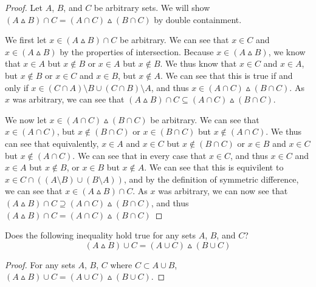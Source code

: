     \begin{proof}
    Let $A$, $B$, and $C$ be arbitrary sets. We will show $(A \vartriangle B) \cap C = (A \cap C) \vartriangle (B \cap C)$ by double containment.
    
    We first let $x \in (A \vartriangle B) \cap C$ be arbitrary. We can see that $x\in C$ and $x\in (A \vartriangle B)$ by the properties of intersection. Because $x\in (A \vartriangle B)$, we know that $x \in A$ but $x \notin B$ or $x \in A$ but $x \notin B$. We thus know that $x\in C$ and $x\in A$, but $x\notin B$ or $x\in C$ and $x\in B$, but $x \notin A$. We can see that this is true if and only if $x \in (C \cap A) \setminus B \cup (C \cap B)\setminus A$, and thus $x \in (A \cap C) \vartriangle (B \cap C)$. As $x$ was arbitrary, we can see that $(A \vartriangle B) \cap C \subseteq (A \cap C) \vartriangle (B \cap C)$.
    
    We now let $x \in (A \cap C) \vartriangle (B \cap C)$ be arbitrary. We can see that $x \in (A \cap C)$, but $x\notin (B \cap C)$ or $x\in (B \cap C)$ but $x\notin (A \cap C)$. We thus can see that equivalently, $x \in A$ and $x\in C$ but $x\notin (B \cap C)$ or $x \in B$ and $x\in C$ but $x\notin (A \cap C)$. We can see that in every case that $x \in C$, and thus $x\in C$ and $x \in A$ but $x\notin B$, or $x \in B$ but $x\notin A$. We can see that this is equivilent to $x \in C \cap ((A\setminus B) \cup (B \setminus A ))$, and by the definition of symmetric difference, we can see that $x \in (A \vartriangle B) \cap C$. As $x$ was arbitrary, we can now see that $(A \vartriangle B) \cap C \supseteq (A \cap C) \vartriangle (B \cap C)$, and thus $(A \vartriangle B) \cap C = (A \cap C) \vartriangle (B \cap C)$
    \end{proof}
    \begin{minorEx}%
    Does the following inequality hold true for any sets $A$, $B$, and $C$? $$(A \vartriangle B) \cup C = (A \cup C) \vartriangle (B \cup C)$$
    \begin{proof}
    For any sets $A$, $B$, $C$ where $C \subset A \cup B$, $(A \vartriangle B) \cup C = (A \cup C) \vartriangle (B \cup C)$.
    \end{proof}
    \end{minorEx}

